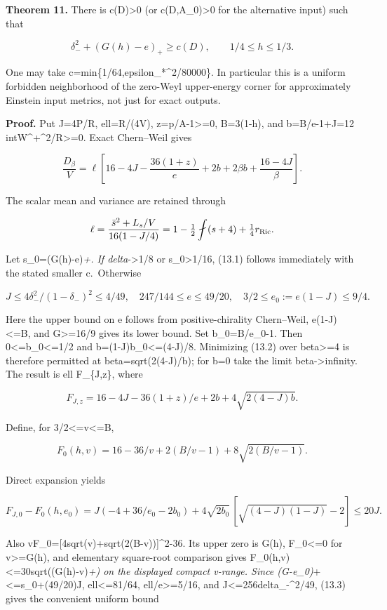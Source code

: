 \documentclass[
  10pt,
]{article}
\begin{document}
\textbf{Theorem 11.} There is c(D)\textgreater0 (or
c(D,A\_0)\textgreater0 for the alternative input) such that

\[
 \boxed{\delta_-^2+(G(h)-e)_+\ge c(D),
                       \qquad 1/4\le h\le1/3.}        \tag{13.1}
\]

One may take c=min\{1/64,epsilon\_*\^{}2/80000\}. In particular this is
a uniform forbidden neighborhood of the zero-Weyl upper-energy corner
for approximately Einstein input metrics, not just for exact outputs.

\textbf{Proof.} Put J=4P/R, ell=R/(4V), z=p/A-1\textgreater=0, B=3(1-h),
and b=B/e-1+J=12 int\textbar W\^{}+\textbar\^{}2/R\textgreater=0. Exact
Chern--Weil gives

\[
 \frac{D_\beta}{V}
  =\ell\left[16-4J-\frac{36(1+z)}e+2b+2\beta b
                                      +\frac{16-4J}{\beta}\right].
                                                               \tag{13.2}
\]

The scalar mean and variance are retained through

\[
 \ell=\frac{\bar s^2+L_s/V}{16(1-J/4)}
      =1-\tfrac12\fint(s+4)+\tfrac14r_{\rm Ric}.
\]

Let s\_0=(G(h)-e)\emph{+. If delta}-\textgreater1/8 or
s\_0\textgreater1/16, (13.1) follows immediately with the stated smaller
c.~Otherwise

\[
 J\le4\delta_-^2/(1-\delta_-)^2\le4/49,\quad
 247/144\le e\le49/20,\quad
 3/2\le e_0:=e(1-J)\le9/4.
\]

Here the upper bound on e follows from positive-chirality Chern--Weil,
e(1-J)\textless=B, and G\textgreater=16/9 gives its lower bound. Set
b\_0=B/e\_0-1. Then 0\textless=b\_0\textless=1/2 and
b=(1-J)b\_0\textless=(4-J)/8. Minimizing (13.2) over beta\textgreater=4
is therefore permitted at beta=sqrt(2(4-J)/b); for b=0 take the limit
beta-\textgreater infinity. The result is ell F\_\{J,z\}, where

\[
 F_{J,z}=16-4J-36(1+z)/e+2b+4\sqrt{2(4-J)b}.
\]

Define, for 3/2\textless=v\textless=B,

\[
 F_0(h,v)=16-36/v+2(B/v-1)+8\sqrt{2(B/v-1)}.
\]

Direct expansion yields

\[
 F_{J,0}-F_0(h,e_0)
 =J(-4+36/e_0-2b_0)
       +4\sqrt{2b_0}\,[\sqrt{(4-J)(1-J)}-2]\le20J.    \tag{13.3}
\]

Also vF\_0={[}4sqrt(v)+sqrt(2(B-v)){]}\^{}2-36. Its upper zero is G(h),
F\_0\textless=0 for v\textgreater=G(h), and elementary square-root
comparison gives F\_0(h,v)\textless=30sqrt((G(h)-v)\emph{+) on the
displayed compact v-range. Since (G-e\_0)}+\textless=s\_0+(49/20)J,
ell\textless=81/64, ell/e\textgreater=5/16, and
J\textless=256delta\_-\^{}2/49, (13.3) gives the convenient uniform
bound
\end{document}
